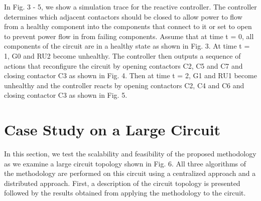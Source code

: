 \documentclass[journal]{IEEEtran}
\begin{document}
In Fig. 3 - 5, we show a simulation trace for the reactive controller. The controller determines which adjacent contactors should be closed to allow power to flow from a healthy component into the components that connect to it or set to open to prevent power flow in from failing components. Assume that at time t = 0, all components of the circuit are in a healthy state as shown in Fig. 3. At time t = 1, G0 and RU2 become unhealthy. The controller then outputs a sequence of actions that reconfigure the circuit by opening contactors C2, C5 and C7 and closing contactor C3 as shown in Fig. 4. Then at time t = 2, G1 and RU1 become unhealthy and the controller reacts by opening contactors C2, C4 and C6 and closing contactor C3 as shown in Fig. 5. 





\section{Case Study on a Large Circuit}

In this section, we test the scalability and feasibility of the proposed methodology as we examine a large circuit topology shown in Fig. 6. All three algorithms of the methodology are performed on this circuit using a centralized approach and a distributed approach. First, a description of the circuit topology is presented followed by the results obtained from applying the methodology to the circuit. 
\end{document}
